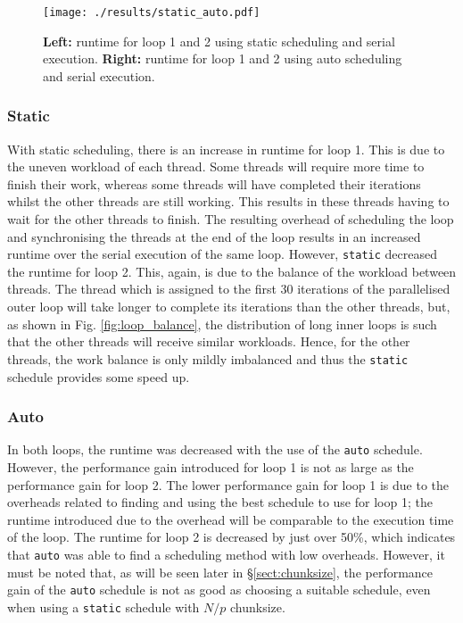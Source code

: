 \documentclass[11pt, a4paper]{article}
\begin{document}
			\begin{figure}
				\centering
				\texttt{[image: ./results/static\_auto.pdf]}
				\caption{\textbf{Left:} runtime for loop 1 and 2 using static scheduling and serial execution. \textbf{Right:} runtime for loop 1 and 2 using auto scheduling and serial execution.}
				\label{fig:static_auto}
			\end{figure}
			
			\subsubsection{Static}
				With static scheduling, there is an increase in runtime for loop 1. This is due to the uneven workload of each thread. Some threads will require more time to finish their work, whereas some threads will have completed their iterations whilst the other threads are still working. This results in these threads having to wait for the other threads to finish. The resulting overhead of scheduling the loop and synchronising the threads at the end of the loop results in an increased runtime over the serial execution of the same loop. However, \texttt{static} decreased the runtime for loop 2. This, again, is due to the balance of the workload between threads. The thread which is assigned to the first 30 iterations of the parallelised outer loop will take longer to complete its iterations than the other threads, but, as shown in Fig. \ref{fig:loop_balance}, the distribution of long inner loops is such that the other threads will receive similar workloads. Hence, for the other threads, the work balance is only mildly imbalanced and thus the \texttt{static} schedule provides some speed up.
				
			\subsubsection{Auto}
				In both loops, the runtime was decreased with the use of the \texttt{auto} schedule. However, the performance gain introduced for loop 1 is not as large as the performance gain for loop 2. The lower performance gain for loop 1 is due to the overheads related to finding and using the best schedule to use for loop 1; the runtime introduced due to the overhead will be comparable to the execution time of the loop. The runtime for loop 2 is decreased by just over 50\%, which indicates that \texttt{auto} was able to find a scheduling method with low overheads. However, it must be noted that, as will be seen later in \S\ref{sect:chunksize}, the performance gain of the \texttt{auto} schedule is not as good as choosing a suitable schedule, even when using a \texttt{static} schedule with $N/p$ chunksize.
		
\end{document}
